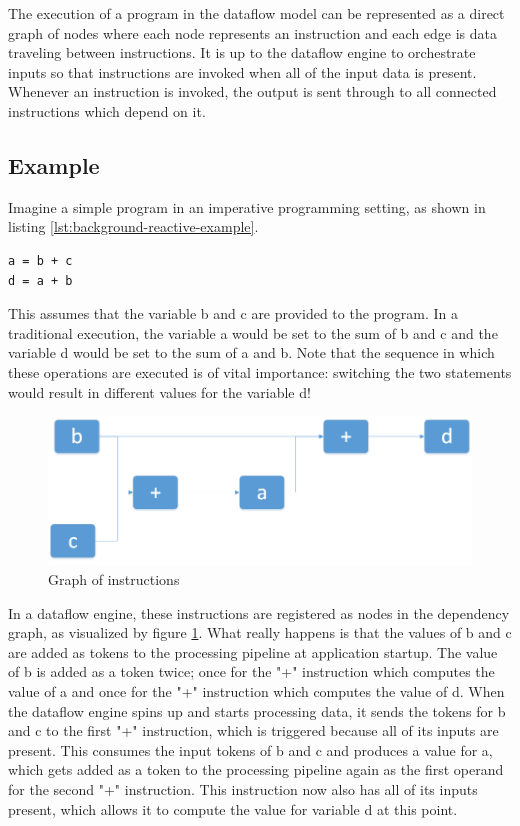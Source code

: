 The execution of a program in the dataflow model can be represented as a direct graph of nodes where each node represents an instruction and each edge is data traveling between instructions. It is up to the dataflow engine to orchestrate inputs so that instructions are invoked when all of the input data is present. Whenever an instruction is invoked, the output is sent through to all connected instructions which depend on it.

\newpage

\subsection{Example}

Imagine a simple program in an imperative programming setting, as shown in listing \ref{lst:background-reactive-example}.

\begin{lstlisting}[caption={A basic data flow program},captionpos=b,label={lst:background-dataflow-example}]
a = b + c
d = a + b
\end{lstlisting}

This assumes that the variable b and c are provided to the program.
In a traditional execution, the variable a would be set to the sum of b and c and the variable d would be set to the sum of a and b. Note that the sequence in which these operations are executed is of vital importance: switching the two statements would result in different values for the variable d!

\begin{figure}[ht]
	\centerline{\includegraphics[width=\textwidth]{images/background-dataflow-example.png}}
	\caption{Graph of instructions}
	\label{fig:background-dataflow-example}
\end{figure}

In a dataflow engine, these instructions are registered as nodes in the dependency graph, as visualized by figure \ref{fig:background-dataflow-example}. What really happens is that the values of b and c are added as tokens to the processing pipeline at application startup. The value of b is added as a token twice; once for the "+" instruction which computes the value of a and once for the "+" instruction which computes the value of d. When the dataflow engine spins up and starts processing data, it sends the tokens for b and c to the first "+" instruction, which is triggered because all of its inputs are present. This consumes the input tokens of b and c and produces a value for a, which gets added as a token to the processing pipeline again as the first operand for the second "+" instruction. This instruction now also has all of its inputs present, which allows it to compute the value for variable d at this point.


